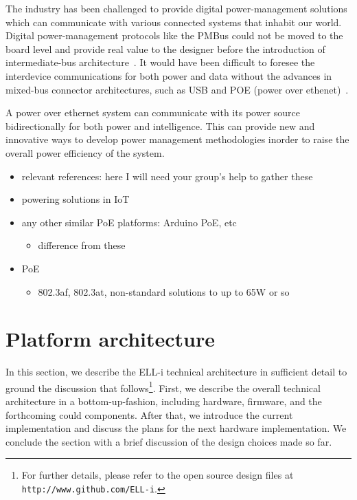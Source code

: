 \documentclass[draft,a4paper]{siamltex}
\begin{document}
The industry has been challenged to provide digital power-management solutions
which can communicate with various connected systems that inhabit our world.
Digital power-management protocols like the PMBus could not be moved to the
board level and provide real value to the designer before the introduction of
intermediate-bus architecture~\cite{FutureIOT}. It would have been difficult to
foresee the interdevice communications for both power and data without the
advances in mixed-bus connector architectures, such as USB and POE (power over
ethenet)~\cite{FutureIOT}. 

A power over ethernet system can communicate with its power source
bidirectionally for both power and intelligence. This can provide new and
innovative ways to develop power management methodologies inorder to raise the
overall power efficiency of the system.

\begin{itemize}
  \item relevant references: here I will need your group's help to gather these
  \item powering solutions in IoT
  \item any other similar PoE platforms: Arduino PoE, etc
    \begin{itemize}
    \item difference from these
    \end{itemize}
  \item PoE
    \begin{itemize}
    \item 802.3af, 802.3at, non-standard solutions to up to 65W or so
    \end{itemize}
\end{itemize}
 

\section{Platform architecture}
\label{sec:architecture}

In this section, we describe the ELL-i technical architecture in
sufficient detail to ground the discussion that follows\footnote{For further
details, please refer to the open source design files at
\hbox{\tt http://www.github.com/ELL-i}.}.
First, we describe the overall technical architecture in a
bottom-up-fashion, including hardware, firmware, and the forthcoming
could components.  After that, we introduce the current
implementation and discuss the plans for the next hardware implementation.  We
conclude the section with a brief discussion of the design choices
made so far.
\end{document}
